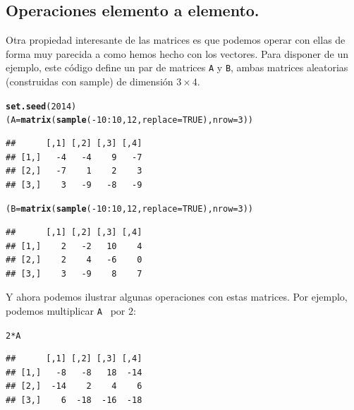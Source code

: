 \documentclass[10pt,a4paper]{article}\usepackage[]{graphicx}\usepackage[]{color}
\makeatletter
\newcommand{\hlnum}[1]{\textcolor[rgb]{0.686,0.059,0.569}{#1}}%
\newcommand{\hlopt}[1]{\textcolor[rgb]{0,0,0}{#1}}%
\newcommand{\hlstd}[1]{\textcolor[rgb]{0.345,0.345,0.345}{#1}}%
\newcommand{\hlkwb}[1]{\textcolor[rgb]{0.69,0.353,0.396}{#1}}%
\newcommand{\hlkwc}[1]{\textcolor[rgb]{0.333,0.667,0.333}{#1}}%
\newcommand{\hlkwd}[1]{\textcolor[rgb]{0.737,0.353,0.396}{\textbf{#1}}}%
\newenvironment{kframe}{%
 \def\at@end@of@kframe{}%
 \ifinner\ifhmode%
  \def\at@end@of@kframe{\end{minipage}}%
  \begin{minipage}{\columnwidth}%
 \fi\fi%
 \def\FrameCommand##1{\hskip\@totalleftmargin \hskip-\fboxsep
 \colorbox{shadecolor}{##1}\hskip-\fboxsep
     \hskip-\linewidth \hskip-\@totalleftmargin \hskip\columnwidth}%
 \MakeFramed {\advance\hsize-\width
   \@totalleftmargin\z@ \linewidth\hsize
   \@setminipage}}%
 {\par\unskip\endMakeFramed%
 \at@end@of@kframe}
\newenvironment{knitrout}{}{} %
\makeatother
\begin{document}
\subsection{Operaciones elemento a elemento.}
\label{tut03:subsec:OperacionesElementoAElementoMatrices}


Otra propiedad interesante de las matrices es que podemos operar con ellas de forma muy parecida a como hemos hecho con los vectores. Para disponer de un ejemplo, este código define un par de matrices {\tt A} y {\tt B}, ambas matrices aleatorias (construidas con sample) de dimensión $3\times 4$.
\begin{knitrout}
\color{fgcolor}\begin{kframe}
\begin{alltt}
    \hlkwd{set.seed}\hlstd{(}\hlnum{2014}\hlstd{)}
    \hlstd{(A} \hlkwb{=} \hlkwd{matrix}\hlstd{(}\hlkwd{sample}\hlstd{(}\hlopt{-}\hlnum{10}\hlopt{:}\hlnum{10}\hlstd{,} \hlnum{12}\hlstd{,} \hlkwc{replace}\hlstd{=}\hlnum{TRUE}\hlstd{),} \hlkwc{nrow}\hlstd{=}\hlnum{3}\hlstd{))}
\end{alltt}
\begin{verbatim}
##      [,1] [,2] [,3] [,4]
## [1,]   -4   -4    9   -7
## [2,]   -7    1    2    3
## [3,]    3   -9   -8   -9
\end{verbatim}
\begin{alltt}
    \hlstd{(B} \hlkwb{=} \hlkwd{matrix}\hlstd{(}\hlkwd{sample}\hlstd{(}\hlopt{-}\hlnum{10}\hlopt{:}\hlnum{10}\hlstd{,} \hlnum{12}\hlstd{,} \hlkwc{replace}\hlstd{=}\hlnum{TRUE}\hlstd{),} \hlkwc{nrow}\hlstd{=}\hlnum{3}\hlstd{))}
\end{alltt}
\begin{verbatim}
##      [,1] [,2] [,3] [,4]
## [1,]    2   -2   10    4
## [2,]    2    4   -6    0
## [3,]    3   -9    8    7
\end{verbatim}
\end{kframe}
\end{knitrout}
Y ahora podemos ilustrar algunas operaciones con estas matrices. Por ejemplo, podemos multiplicar {\tt A } por $2$:
\begin{knitrout}
\color{fgcolor}\begin{kframe}
\begin{alltt}
    \hlnum{2} \hlopt{*} \hlstd{A}
\end{alltt}
\begin{verbatim}
##      [,1] [,2] [,3] [,4]
## [1,]   -8   -8   18  -14
## [2,]  -14    2    4    6
## [3,]    6  -18  -16  -18
\end{verbatim}
\end{kframe}
\end{knitrout}
\end{document}
